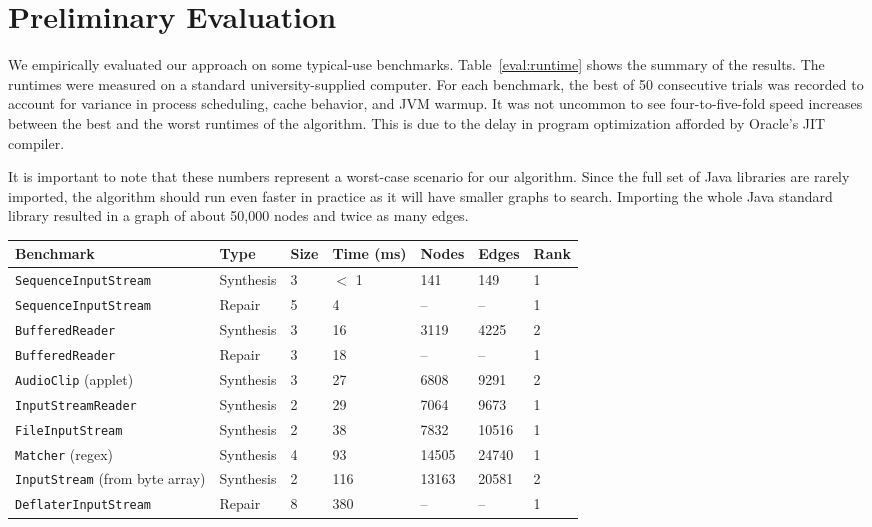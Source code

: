 \section{Preliminary Evaluation}
\label{sec:evaluation}

We empirically evaluated our approach on some typical-use benchmarks. Table~\ref{eval:runtime} shows the summary of the results. The runtimes were measured on a standard university-supplied computer. For each benchmark, the best of 50 consecutive trials was recorded to account for variance in process scheduling, cache behavior, and JVM warmup. It was not uncommon to see four-to-five-fold speed increases between the best and the worst runtimes of the algorithm. This is due to the delay in program optimization afforded by Oracle's JIT compiler.

It is important to note that these numbers represent a worst-case scenario for our algorithm. Since the full set of Java libraries are rarely imported, the algorithm should run even faster in practice as it will have smaller graphs to search. Importing the whole Java standard library resulted in a graph of about 50,000 nodes and twice as many edges.
\begin{table*}[hbt]
  \centering
  \begin{tabularx}{\linewidth}{| l | X | X | X | X | X | X |}
    \hline
    \textbf{Benchmark} & \textbf{Type} & \textbf{Size} & \textbf{Time (ms)} & \textbf{Nodes} & \textbf{Edges} & \textbf{Rank} \\ \hline
	\texttt{SequenceInputStream} & Synthesis & 3 & $<$ 1 & 141   & 149   & 1 \\ \hline
	\texttt{SequenceInputStream} & Repair    & 5 & 4   & --    & --    & 1 \\ \hline
    \texttt{BufferedReader}      & Synthesis & 3 & 16  & 3119  & 4225  & 2 \\ \hline
    \texttt{BufferedReader}      & Repair    & 3 & 18  & --    & --    & 1 \\ \hline
    \texttt{AudioClip} (applet)  & Synthesis & 3 & 27  & 6808  & 9291  & 2 \\ \hline
    \texttt{InputStreamReader}   & Synthesis & 2 & 29  & 7064  & 9673  & 1 \\ \hline
    \texttt{FileInputStream}     & Synthesis & 2 & 38  & 7832  & 10516 & 1 \\ \hline
    \texttt{Matcher} (regex)     & Synthesis & 4 & 93  & 14505 & 24740 & 1 \\ \hline
    \texttt{InputStream} (from byte array) & Synthesis & 2 & 116 & 13163  & 20581  & 2 \\ \hline
    \texttt{DeflaterInputStream} & Repair & 8    & 380 & -- & -- & 1 \\ \hline
  \end{tabularx}
  \caption{Typical-use runtimes in various benchmarks. ``Nodes'' and ``Edges'' refer to the size of the searched subgraph, and ``Rank'' indicates the correct expression's position among the results. The ``size'' refers to the number of subexpressions in the output expression. Each test case was initialized with a small environment consisting of five variables, and produced ten results.}
  \label{eval:runtime}
\end{table*}

